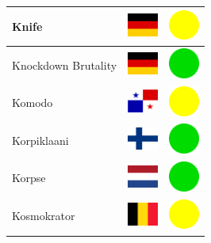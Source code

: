 \documentclass[12pt, a4paper, twoside]{report}
\begin{document}
\begin{center}
\begin{longtable}{|p{5cm}|p{2cm}|p{2cm}|}
			Knife & \includegraphics[width=1cm]{4x3/de} & \includegraphics[width=1cm]{likes/m} \\ \hline
			Knockdown Brutality & \includegraphics[width=1cm]{4x3/de} & \includegraphics[width=1cm]{likes/y} \\ \hline
			Komodo & \includegraphics[width=1cm]{4x3/pa} & \includegraphics[width=1cm]{likes/m} \\ \hline
			Korpiklaani & \includegraphics[width=1cm]{4x3/fi} & \includegraphics[width=1cm]{likes/y} \\ \hline
			Korpse & \includegraphics[width=1cm]{4x3/nl} & \includegraphics[width=1cm]{likes/y} \\ \hline
			Kosmokrator & \includegraphics[width=1cm]{4x3/be} & \includegraphics[width=1cm]{likes/m} \\ \hline

\end{longtable}
\end{center}
\end{document}

